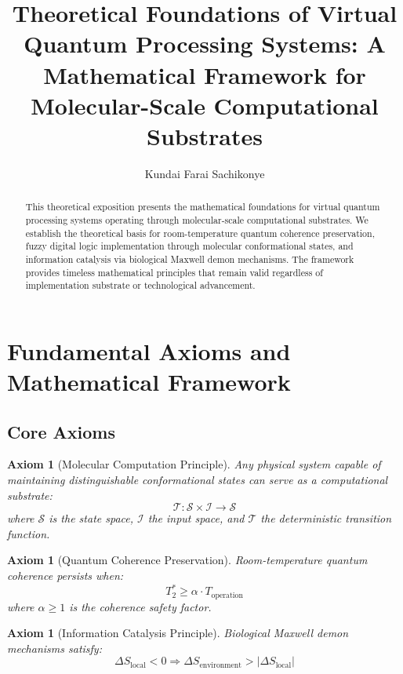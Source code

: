 \documentclass[12pt]{article}
\title{Theoretical Foundations of Virtual Quantum Processing Systems: A Mathematical Framework for Molecular-Scale Computational Substrates}
\author{Kundai Farai Sachikonye}
\date{}
\newtheorem{axiom}[theorem]{Axiom}
\begin{document}
\maketitle

\begin{abstract}
This theoretical exposition presents the mathematical foundations for virtual quantum processing systems operating through molecular-scale computational substrates. We establish the theoretical basis for room-temperature quantum coherence preservation, fuzzy digital logic implementation through molecular conformational states, and information catalysis via biological Maxwell demon mechanisms. The framework provides timeless mathematical principles that remain valid regardless of implementation substrate or technological advancement.
\end{abstract}

\section{Fundamental Axioms and Mathematical Framework}

\subsection{Core Axioms}

\begin{axiom}[Molecular Computation Principle]
Any physical system capable of maintaining distinguishable conformational states can serve as a computational substrate:
\begin{equation}
\mathcal{T}: \mathcal{S} \times \mathcal{I} \rightarrow \mathcal{S}
\end{equation}
where $\mathcal{S}$ is the state space, $\mathcal{I}$ the input space, and $\mathcal{T}$ the deterministic transition function.
\end{axiom}

\begin{axiom}[Quantum Coherence Preservation]
Room-temperature quantum coherence persists when:
\begin{equation}
T_{2}^{*} \geq \alpha \cdot T_{\text{operation}}
\end{equation}
where $\alpha \geq 1$ is the coherence safety factor.
\end{axiom}

\begin{axiom}[Information Catalysis Principle]
Biological Maxwell demon mechanisms satisfy:
\begin{equation}
\Delta S_{\text{local}} < 0 \Rightarrow \Delta S_{\text{environment}} > |\Delta S_{\text{local}}|
\end{equation}
\end{axiom}
\end{document}
